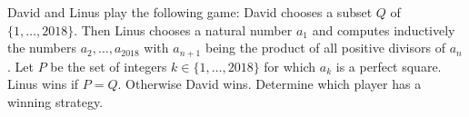 David and Linus play the following game: 
David chooses a subset $Q$ of $\{1, \dots ,2018\}$.
Then Linus chooses a natural number $a_1$ and computes inductively the numbers
$a_2, \dots, a_{2018}$ with $a_{n+1}$ being the product of all positive divisors of $a_n$.
Let $P$ be the set of integers $k\in\{1,\dots,2018\}$ for which $a_k$ is a perfect square.
Linus wins if $P=Q$. Otherwise David wins.
Determine which player has a winning strategy.
